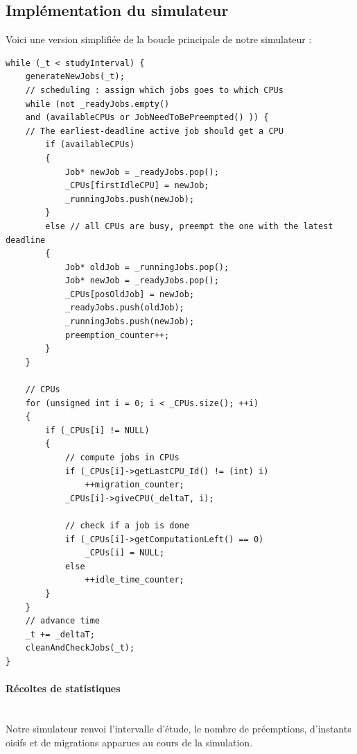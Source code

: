 \documentclass[a4paper,10pt]{article}
\begin{document}
	\subsection{Implémentation du simulateur}
		Voici une version simplifiée de la boucle principale de notre simulateur :
		\begin{lstlisting}
while (_t < studyInterval) {
	generateNewJobs(_t);
	// scheduling : assign which jobs goes to which CPUs
	while (not _readyJobs.empty()
	and (availableCPUs or JobNeedToBePreempted() )) {
	// The earliest-deadline active job should get a CPU
		if (availableCPUs)
		{
			Job* newJob = _readyJobs.pop();
			_CPUs[firstIdleCPU] = newJob;
			_runningJobs.push(newJob);
		}
		else // all CPUs are busy, preempt the one with the latest deadline
		{
			Job* oldJob = _runningJobs.pop();
			Job* newJob = _readyJobs.pop();
			_CPUs[posOldJob] = newJob;
			_readyJobs.push(oldJob);
			_runningJobs.push(newJob);
			preemption_counter++;
		}
	}

	// CPUs
	for (unsigned int i = 0; i < _CPUs.size(); ++i)
	{
		if (_CPUs[i] != NULL)
		{
			// compute jobs in CPUs
			if (_CPUs[i]->getLastCPU_Id() != (int) i)
				++migration_counter;
			_CPUs[i]->giveCPU(_deltaT, i);
			
			// check if a job is done
			if (_CPUs[i]->getComputationLeft() == 0)
				_CPUs[i] = NULL;
			else
				++idle_time_counter;
		}
	}
	// advance time
	_t += _deltaT;
	cleanAndCheckJobs(_t);
}
\end{lstlisting}
\fontfamily{}

		\paragraph*{Récoltes de statistiques}~\\

			Notre simulateur renvoi l'intervalle d'étude, le nombre de préemptions, d'instants oisifs et de migrations apparues au cours de la simulation.

		

	
\end{document}
